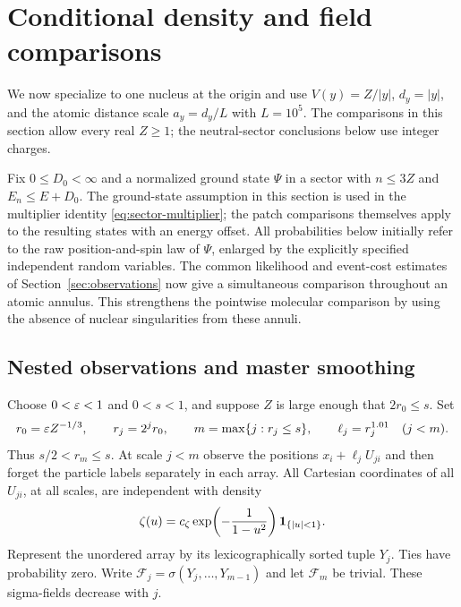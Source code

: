 \section{Conditional density and field comparisons}\label{a:sec:conditioning}

We now specialize to one nucleus at the origin and use
$V(y)=Z/|y|$, $d_y=|y|$, and the atomic distance scale
$a_y=d_y/L$ with $L=10^5$. The comparisons in this section allow every
real $Z\ge1$; the neutral-sector conclusions below use integer charges.

Fix $0\le D_0<\infty$ and a normalized ground state $\Psi$ in a sector
with $n\le3Z$ and $E_n\le E+D_0$. The ground-state assumption in
this section is used in the multiplier identity
\eqref{eq:sector-multiplier}; the patch comparisons themselves apply
to the resulting states with an energy offset. All probabilities
below initially refer to the raw position-and-spin law of $\Psi$,
enlarged by the explicitly specified independent random variables.
The common likelihood and event-cost estimates of
Section~\ref{sec:observations} now give a simultaneous comparison throughout
an atomic annulus. This strengthens the pointwise molecular comparison by
using the absence of nuclear singularities from these annuli.

\subsection{Nested observations and master smoothing}

Choose $0<\varepsilon<1$ and $0<s<1$, and suppose $Z$ is large enough that
$2r_0\le s$. Set
\begin{equation}\label{a:eq:cond-observations}
 r_0=\varepsilon Z^{-1/3},\qquad r_j=2^jr_0,\qquad
 m=\max\{j:r_j\le s\},\qquad \ell_j=r_j^{1.01}\quad(j<m).
\end{equation}
Thus $s/2<r_m\le s$. At scale $j<m$ observe the positions
$x_i+\ell_j U_{ji}$ and then forget the particle labels separately
in each array. All Cartesian coordinates of all $U_{ji}$, at all
scales, are independent with density
\[
 \zeta(u)=c_\zeta\exp\!\left(-\frac1{1-u^2}\right)
                  \mathbf 1_{\{|u|<1\}}.
\]
Represent the unordered array by its lexicographically sorted tuple
$Y_j$. Ties have probability zero. Write
$\mathcal F_j=\sigma(Y_j,\ldots,Y_{m-1})$ and let
$\mathcal F_m$ be trivial. These sigma-fields decrease with $j$.

